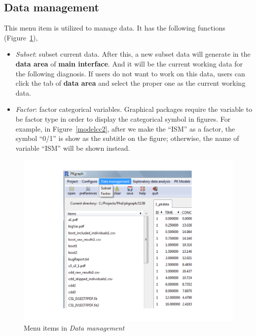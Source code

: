 \documentclass[a4paper]{article}
\begin{document}
\subsection{Data management}
This menu item is utilized to manage data. It has the following functions (Figure~\ref{data}),
\begin{itemize}
	\item \textit{Subset}: subset current data. After this, a new subset data will generate in the \textbf{data area} of \textbf{main interface}. And it will be the current working data for the following diagnosis. If users do not want to work on this data, users can click the tab of \textbf{data area} and select the proper one as the current working data.
	\item \textit{Factor}: factor categorical variables. 
	Graphical packages require the variable to be factor type in order to 
	display the categorical symbol in figures.	
	For example, in Figure~\ref{modelcc2}, after we make the ``ISM'' as a factor, 
	the symbol ``0/1'' is show as the subtitle on the figure; otherwise, 
	the name of variable ``ISM''
	will be shown instead.
\end{itemize}
\begin{figure}[h!tb] \centering
\includegraphics[scale=0.6]{data.pdf}
\caption{Menu items in \textit{Data management}}
\label{data}
\end{figure}
\end{document}
